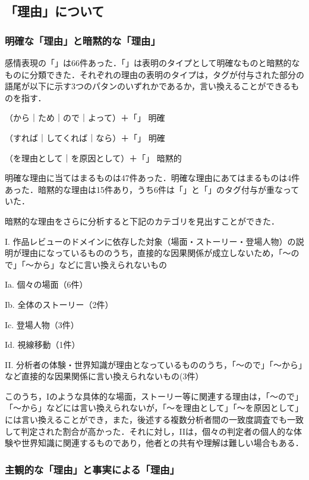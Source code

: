 \documentclass[japanese]{jnlp_1.3a}
\def\maru#1{}
\begin{document}
\subsection{「理由」について}

\subsubsection{明確な「理由」と暗黙的な「理由」}

感情表現の「」は66件あった．「」は表明のタイプとして明確なものと暗黙的なものに分類できた．それぞれの理由の表明のタイプは，タグが付与された部分の語尾が以下に示す3つのパタンのいずれかであるか，言い換えることができるものを指す．

（から｜ため｜ので｜よって）＋「」 明確\maru{1}

（すれば｜してくれば｜なら）＋「」 明確\maru{2}

（を理由として｜を原因として）＋「」 暗黙的

明確な理由\maru{1}に当てはまるものは47件あった．明確な理由\maru{2}にあてはまるものは4件あった．暗黙的な理由は15件あり，うち6件は「」と「」のタグ付与が重なっていた．

暗黙的な理由をさらに分析すると下記のカテゴリを見出すことができた．

\noindent
I. 作品レビューのドメインに依存した対象（場面・ストーリー・登場人物）の説明が理由になっているもののうち，直接的な因果関係が成立しないため，「〜ので」「〜から」などに言い換えられないもの

Ia. 個々の場面（6件）

Ib. 全体のストーリー（2件）

Ic. 登場人物（3件）

Id. 視線移動（1件）

\noindent
II. 分析者の体験・世界知識が理由となっているもののうち，「〜ので」「〜から」など直接的な因果関係に言い換えられないもの(3件）

このうち，Iのような具体的な場面，ストーリー等に関連する理由は，「〜ので」「〜から」などには言い換えられないが，「〜を理由として」「〜を原因として」には言い換えることができ，また，後述する複数分析者間の一致度調査でも一致して判定された割合が高かった．それに対し，IIは，個々の判定者の個人的な体験や世界知識に関連するものであり，他者との共有や理解は難しい場合もある．

\subsubsection{主観的な「理由」と事実による「理由」}
\end{document}
